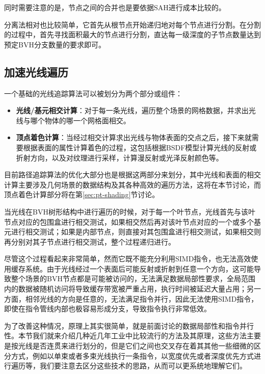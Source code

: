 同时需要注意的是，节点之间的合并也是要依据SAH进行成本比较的。

分离法相对也比较简单，它首先从根节点开始递归地对每个节点进行分割。在分割的过程中，首先寻找面积最大的节点进行分割，直达每一级深度的子节点数量达到预定BVH分支数量的要求即可。








\subsection{加速光线遍历}\label{sec:pt-ray-trversal}
一个基础的光线追踪算法可以被划分为两个部分或组件：

\begin{itemize}
	\item \textbf{光线/基元相交计算}：对于每一条光线，遍历整个场景的网格数据，并求出光线与哪个物体的哪一个网格面相交。
	\item \textbf{顶点着色计算}：当经过相交计算求出光线与物体表面的交点之后，接下来就需要根据表面的属性计算着色的过程，这包括根据BSDF模型计算光线的反射或折射方向，以及对纹理进行采样，计算漫反射或光泽反射颜色等。
\end{itemize}

目前路径追踪算法的优化大部分也是根据这两部分来划分，其中光线和表面的相交计算主要涉及几何场景的数据结构及其各种高效的遍历方法，这将在本节讨论，而顶点着色计算部分将在第\ref{sec:pt-shading}节讨论。

当光线在BVH树形结构中进行遍历的时候，对于每一个叶节点，光线首先与该叶节点对应的包围盒进行相交测试，如果相交然后再对该叶节点对应的一个或多个基元进行相交测试；如果是内部节点，则直接对其包围盒进行相交测试，如果相交则再分别对其子节点进行相交测试，整个过程递归进行。

尽管这个过程看起来非常简单，然而它既不能充分利用SIMD指令，也无法高效使用缓存系统。由于光线经过一个表面后可能反射或折射到任意一个方向，这可能导致整个场景的BVH节点都是可能被访问的，无法满足数据局部性要求，全局范围内的数据被随机访问将导致缓存带宽被严重占用，执行时间被延迟大量占用；另一方面，相邻光线的方向是任意的，无法满足指令并行，因此无法使用SIMD指令，即使在指令管线内部也极容易形成分支，导致指令执行非常低效。

 为了改善这种情况，原理上其实很简单，就是前面讨论的数据局部性和指令并行性。本节我们就来介绍几种近几年工业中比较流行的方法及其原理，这些方法主要是按光线是否连贯来进行划分的，但是它们之间也交叉存在着其其他一些细微的区分方式，例如以单束或者多束光线执行一条指令，以宽度优先或者深度优先方式进行遍历等，我们要注意去区分这些技术的思路，从而可以更系统地理解它们。





